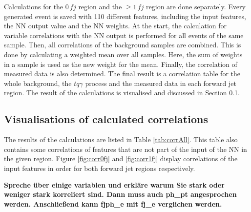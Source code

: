 Calculations for the $0\, fj$ region and the $\geq 1\, fj$ region are done separately.  
Every generated event is saved with 110 different features, including the input features, the NN output value and the NN weights. 
At the start, the calculation for variable correlations with the NN output is performed for all events of the same sample.  
Then, all correlations of the background samples are combined. This is done by calculating a weighted mean over all samples. Here, the sum of weights in a sample is used as the new weight for the mean.
Finally, the correlation of measured data is also determined. The final result is a correlation table for the whole background, the $tq\gamma$ process and the measured data in each forward jet region. 
The result of the calculations is visualised and discussed in Section \ref{sec:corrvis}.


\subsection{Visualisations of calculated correlations}
\label{sec:corrvis}
The results of the calculations are listed in Table \ref{tab:corrAll}. This table also contains some correlations of features that are not part of the input of the NN in the given region.  
Figure \ref{fig:corr0fj} and \autoref{fig:corr1fj} display correlations of the input features in order for both forward jet regions respectively. 

\textbf{Spreche über einige variablen und erkläre warum Sie stark oder weniger stark korreliert sind. Dann muss auch ph\_pt angesprochen werden. Anschließend kann fjph\_e mit fj\_e verglichen werden.}

